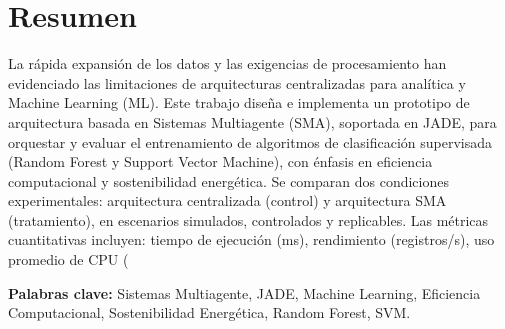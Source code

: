 \documentclass[12pt,oneside]{report}
\begin{document}
\chapter*{Resumen}
La rápida expansión de los datos y las exigencias de procesamiento han evidenciado las limitaciones de arquitecturas centralizadas para analítica y Machine Learning (ML). Este trabajo diseña e implementa un prototipo de arquitectura basada en Sistemas Multiagente (SMA), soportada en JADE, para orquestar y evaluar el entrenamiento de algoritmos de clasificación supervisada (Random Forest y Support Vector Machine), con énfasis en eficiencia computacional y sostenibilidad energética. Se comparan dos condiciones experimentales: arquitectura centralizada (control) y arquitectura SMA (tratamiento), en escenarios simulados, controlados y replicables. Las métricas cuantitativas incluyen: tiempo de ejecución (ms), rendimiento (registros/s), uso promedio de CPU (%

\vspace{0.5cm}
\noindent\textbf{Palabras clave:} Sistemas Multiagente, JADE, Machine Learning, Eficiencia Computacional, Sostenibilidad Energética, Random Forest, SVM.
\end{document}

